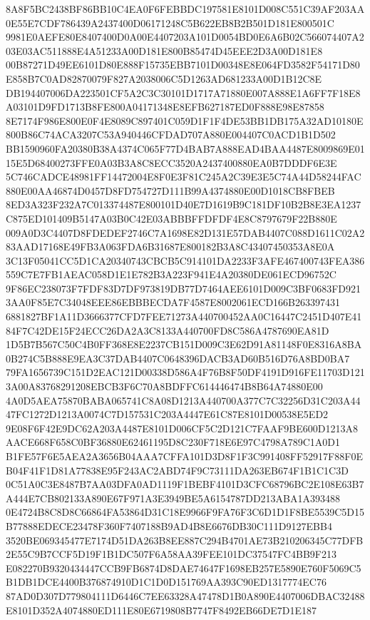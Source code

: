\documentclass[UTF8,fontset=fandol,zihao=-4,a4paper]{ctexart}
\begin{document}
{{8A8F5BC2438BF86BB10C4EA0F6FEBBDC197581E8101D008C551C39AF203AA0E55E7CDF786439A2437400D06171248C5B622EB8B2B501D181E800501C
9981E0AEFE80E8407400D0A00E4407203A101D0054BD0E6A6B02C566074407A203E03AC511888E4A51233A00D181E800B85474D45EEE2D3A00D181E8
00B87271D49EE6101D80E888F15735EBB7101D00348E8E064FD3582F54171D80E858B7C0AD82870079F827A2038006C5D1263AD681233A00D1B12C8E
DB194407006DA223501CF5A2C3C30101D1717A71880E007A888E1A6FF7F18E8A03101D9FD1713B8FE800A04171348E8EFB627187ED0F888E98E87858
8E7174F986E800E0F4E8089C897401C059D1F1F4DE53BB1DB175A32AD10180E800B86C74ACA3207C53A940446CFDAD707A880E004407C0ACD1B1D502
BB1590960FA20380B38A4374C065F77D4BAB7A888EAD4BAA4487E8009869E0115E5D68400273FFE0A03B3A8C8ECC3520A2437400880EA0B7DDDF6E3E
5C746CADCE48981FF14472004E8F0E3F81C245A2C39E3E5C74A44D58244FAC880E00AA46874D0457D8FD754727D111B99A4374880E00D1018CB8FBEB
8ED3A323F232A7C013374487E800101D40E7D1619B9C181DF10B2B8E3EA1237C875ED101409B5147A03B0C42E03ABBBFFDFDF4E8C8797679F22B880E
009A0D3C4407D8FDEDEF2746C7A1698E82D131E57DAB4407C088D1611C02A283AAD17168E49FB3A063FDA6B31687E800182B3A8C43407450353A8E0A
3C13F05041CC5D1CA20340743CBCB5C914101DA2233F3AFE467400743FEA386559C7E7FB1AEAC058D1E1E782B3A223F941E4A20380DE061ECD96752C
9F86EC238073F7FDF83D7DF973819DB77D7464AEE6101D009C3BF0683FD9213AA0F85E7C34048EEE86EBBBECDA7F4587E8002061ECD166B263397431
6881827BF1A11D3666377CFD7FEE71273A440700452AA0C16447C2451D407E4184F7C42DE15F24ECC26DA2A3C8133A440700FD8C586A4787690EA81D
1D5B7B567C50C4B0FF368E8E2237CB151D009C3E62D91A81148F0E8316A8BA0B274C5B888E9EA3C37DAB4407C0648396DACB3AD60B516D76A8BD0BA7
79FA1656739C151D2EAC121D00338D586A4F76B8F50DF4191D916FE11703D1213A00A83768291208EBCB3F6C70A8BDFFC614446474B8B64A74880E00
4A0D5AEA75870BABA065741C8A08D1213A440700A377C7C32256D31C203A4447FC1272D1213A0074C7D157531C203A4447E61C87E8101D00538E5ED2
9E08F6F42E9DC62A203A4487E8101D006CF5C2D121C7FAAF9BE600D1213A8AACE668F658C0BF36880E62461195D8C230F718E6E97C4798A789C1A0D1
B1FE57F6E5AEA2A3656B04AAA7CFFA101D3D8F1F3C991408FF52917F88F0EB04F41F1D81A77838E95F243AC2ABD74F9C73111DA263EB674F1B1C1C3D
0C51A0C3E8487B7AA03DFA0AD1119F1BEBF4101D3CFC68796BC2E108E63B7A444E7CB802133A890E67F971A3E3949BE5A6154787DD213ABA1A393488
0E4724B8C8D8C66864FA53864D31C18E9966F9FA76F3C6D1D1F8BE5539C5D15B77888EDECE23478F360F7407188B9AD4B8E6676DB30C111D9127EBB4
3520BE069345477E7174D51DA263B8EE887C294B4701AE73B210206345C77DFB2E55C9B7CCF5D19F1B1DC507F6A58AA39FEE101DC37547FC4BB9F213
E082270B9320434447CCB9FB6874D8DAE74647F1698EB257E5890E760F5069C5B1DB1DCE4400B376874910D1C1D0D151769AA393C90ED1317774EC76
87AD0D307D779804111D6446C7EE63328A47478D1B0A890E4407006DBAC32488E8101D352A4074880ED111E80E6719808B7747F8492EB66DE7D1E187
}}
\end{document}
